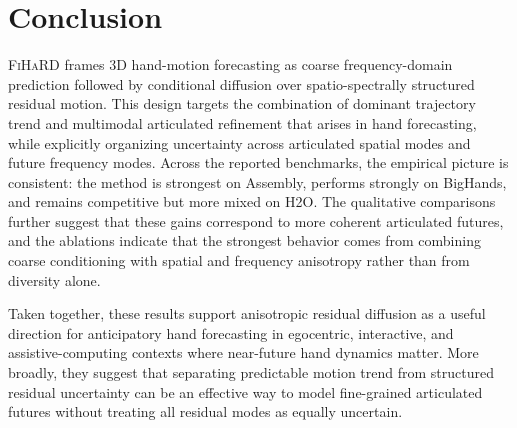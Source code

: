 \documentclass[runningheads]{llncs}
\newcommand{\modelname}{\textsc{FiHaRD}}
\begin{document}
\section{Conclusion}

\modelname{} frames 3D hand-motion forecasting as coarse frequency-domain prediction followed by conditional diffusion over spatio-spectrally structured residual motion. This design targets the combination of dominant trajectory trend and multimodal articulated refinement that arises in hand forecasting, while explicitly organizing uncertainty across articulated spatial modes and future frequency modes. Across the reported benchmarks, the empirical picture is consistent: the method is strongest on Assembly, performs strongly on BigHands, and remains competitive but more mixed on H2O. The qualitative comparisons further suggest that these gains correspond to more coherent articulated futures, and the ablations indicate that the strongest behavior comes from combining coarse conditioning with spatial and frequency anisotropy rather than from diversity alone.

Taken together, these results support anisotropic residual diffusion as a useful direction for anticipatory hand forecasting in egocentric, interactive, and assistive-computing contexts where near-future hand dynamics matter. More broadly, they suggest that separating predictable motion trend from structured residual uncertainty can be an effective way to model fine-grained articulated futures without treating all residual modes as equally uncertain.



\end{document}
